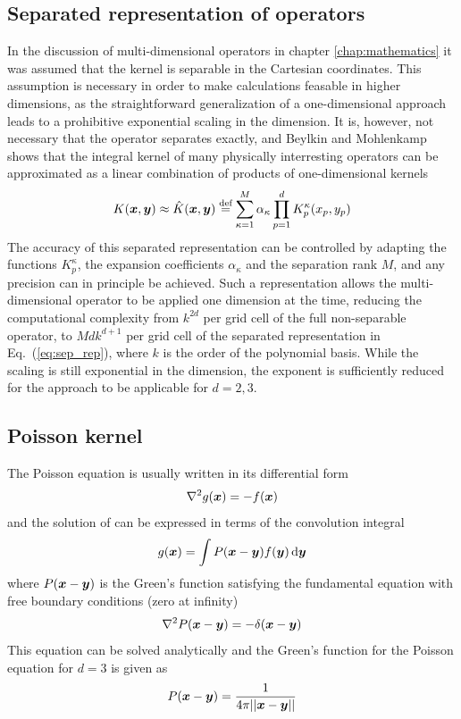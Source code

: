 \subsection{Separated representation of operators}
In the discussion of multi-dimensional operators in chapter \ref{chap:mathematics} it
was assumed that the kernel is separable in the Cartesian coordinates. This assumption 
is necessary in order to make calculations feasable in higher dimensions, as the 
straightforward generalization of a one-dimensional approach leads to a prohibitive 
exponential scaling in the dimension. It is,
however, not necessary that the operator separates exactly, and Beylkin 
and Mohlenkamp~\cite{Beylkin:2002p429,Beylkin:2005p45} shows that the integral 
kernel of many physically interresting operators can be approximated as a linear 
combination of products of one-dimensional kernels
\begin{equation}
    \label{eq:sep_rep}
    K(\boldsymbol x,\boldsymbol y) \approx \hat{K}(\boldsymbol x,\boldsymbol y) \stackrel{\text{def}}{\hbox{=}} 
	\sum_{\kappa=1}^{M}\alpha_\kappa \prod_{p=1}^d K_p^\kappa(x_p,y_p)
\end{equation}
The accuracy of this separated representation can be controlled by adapting
the functions $K_p^\kappa$, the expansion coefficients $\alpha_\kappa$ and the 
separation rank $M$, and any precision can in principle be achieved. Such
a representation allows the multi-dimensional operator to be applied one 
dimension at the time, reducing the computational complexity from
$k^{2d}$ per grid cell of the full non-separable operator, to $Mdk^{d+1}$ 
per grid cell of the separated representation in Eq.~(\ref{eq:sep_rep}),
where $k$ is the order of the polynomial basis. While the scaling is still 
exponential in the dimension, the exponent is sufficiently reduced for the 
approach to be applicable for $d=2,3$. 

\subsection{Poisson kernel}
The Poisson equation is usually written in its differential form
\begin{equation}
    \nabla^2 g(\boldsymbol x) = -f(\boldsymbol x)
\end{equation}
and the solution of can be expressed in terms of the convolution integral
\begin{equation}
    g(\boldsymbol x) = \int P(\boldsymbol x-\boldsymbol y)f(\boldsymbol y)\,\mathrm{d}\boldsymbol y
\end{equation}
where $P(\boldsymbol x-\boldsymbol y)$ is the Green's function satisfying the fundamental 
equation with free boundary conditions (zero at infinity)
\begin{equation}
    \label{eq:fundamental_poisson}
    \nabla^2 P(\boldsymbol x-\boldsymbol y) = -\delta(\boldsymbol x-\boldsymbol y)
\end{equation}
This equation can be solved analytically and the Green's function for
the Poisson equation for $d=3$ is given as
\begin{equation}
    \label{eq:poisson_kern}
    P(\boldsymbol x-\boldsymbol y) = \frac{1}{4\pi||\boldsymbol x-\boldsymbol y||}
\end{equation}

